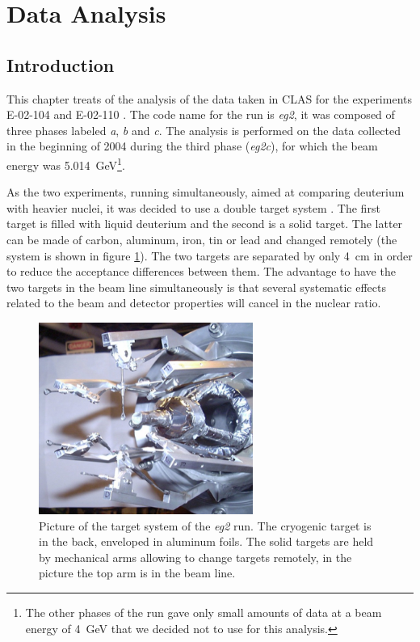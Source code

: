 \section{Data Analysis}
\label{chap:analysis}

\subsection{Introduction}

This chapter treats of the analysis of the data taken in CLAS for the 
experiments E-02-104 \cite{Brooks:2002aa} and E-02-110 \cite{Hafidi:2002aa}.
The code name for the run is {\it eg2}, it was composed of three phases 
labeled {\it a}, {\it b} and {\it c}. The analysis is performed on the data 
collected in the beginning of 2004 during the third phase ({\it eg2c}), for 
which the beam energy was 5.014~GeV\footnote{The other phases of the run gave only small 
amounts of data at a beam energy of 4~GeV that we decided not to use for this analysis.}.

As the two experiments, running simultaneously, aimed at comparing deuterium 
with heavier nuclei, it was decided to use a double target system 
\cite{Hakobyan:2008zz}. The first target is filled with liquid deuterium and 
the second is a solid target. The latter can be made of carbon, aluminum, 
iron, tin or lead and changed remotely (the system is shown in figure 
\ref{fig:phototarget}). The two targets are separated by only 4~cm in order to reduce
the acceptance differences between them. The 
advantage to have the two targets in the beam line simultaneously
is that several systematic effects related to the beam 
and detector properties will cancel in the nuclear ratio.

\begin{figure}[htbp]
\centering
\includegraphics[width=7cm] {chap5-fig/PhTar.jpg} 
\caption {Picture of the target system of the {\it eg2} run. The cryogenic target is 
in the back, enveloped in aluminum foils. The solid targets are held by mechanical arms
allowing to change targets remotely, in the picture the top arm is in the beam line.}
\label{fig:phototarget}
\end{figure}

